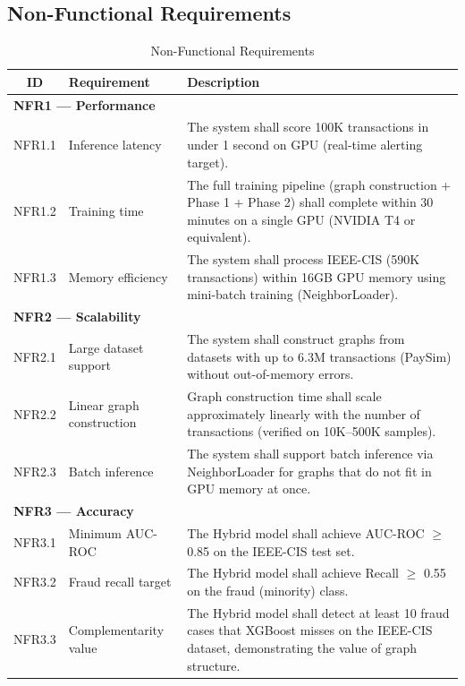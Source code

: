 \subsection{Non-Functional Requirements}

\begin{table}[h!]
\centering
\caption{Non-Functional Requirements}
\label{tab:nonfunctional-requirements}
\begin{tabular}{|c|p{4cm}|p{8cm}|}
\hline
\textbf{ID} & \textbf{Requirement} & \textbf{Description} \\
\hline

\multicolumn{3}{|l|}{\textbf{NFR1 — Performance}} \\
\hline
NFR1.1 & Inference latency & The system shall score 100K transactions in under 1 second on GPU (real-time alerting target). \\
\hline
NFR1.2 & Training time & The full training pipeline (graph construction + Phase 1 + Phase 2) shall complete within 30 minutes on a single GPU (NVIDIA T4 or equivalent). \\
\hline
NFR1.3 & Memory efficiency & The system shall process IEEE-CIS (590K transactions) within 16GB GPU memory using mini-batch training (NeighborLoader). \\
\hline

\multicolumn{3}{|l|}{\textbf{NFR2 — Scalability}} \\
\hline
NFR2.1 & Large dataset support & The system shall construct graphs from datasets with up to 6.3M transactions (PaySim) without out-of-memory errors. \\
\hline
NFR2.2 & Linear graph construction & Graph construction time shall scale approximately linearly with the number of transactions (verified on 10K--500K samples). \\
\hline
NFR2.3 & Batch inference & The system shall support batch inference via NeighborLoader for graphs that do not fit in GPU memory at once. \\
\hline

\multicolumn{3}{|l|}{\textbf{NFR3 — Accuracy}} \\
\hline
NFR3.1 & Minimum AUC-ROC & The Hybrid model shall achieve AUC-ROC $\geq$ 0.85 on the IEEE-CIS test set. \\
\hline
NFR3.2 & Fraud recall target & The Hybrid model shall achieve Recall $\geq$ 0.55 on the fraud (minority) class. \\
\hline
NFR3.3 & Complementarity value & The Hybrid model shall detect at least 10 fraud cases that XGBoost misses on the IEEE-CIS dataset, demonstrating the value of graph structure. \\
\hline


\end{tabular}
\end{table}
